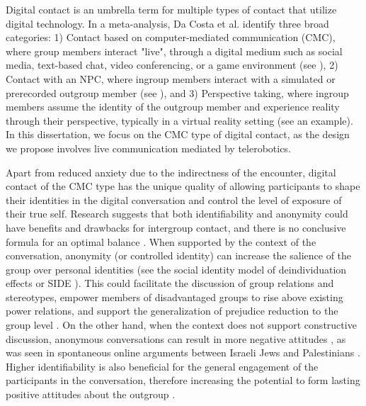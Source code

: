 \documentclass[dissertation,math,vertlayout,pdfa,colorlinks,nologo]{aaltoseries}
\begin{document}
Digital contact is an umbrella term for multiple types of contact that utilize digital technology. In a meta-analysis, Da Costa et al. \cite{pereiradacostaDoesDigitalIntergroup2024} identify three broad categories: 1) Contact based on computer-mediated communication (CMC), where group members interact "live", through a digital medium such as social media, text-based chat, video conferencing, or a game environment (see \cite{whiteTextbasedEcontactHarnessing2020,imperatoAllportMeetsInternet2021,amzalagImprovingIntergroupRelations2021,amichai-hamburgerContactHypothesisReconsidered2006, benatovGamingPeaceVirtual2021}), 2) Contact with an NPC, where ingroup members interact with a simulated or prerecorded outgroup member (see \cite{haslerVirtualPeacemakersMimicry2014,kabiljoVirtualRealityFostering2019}), and 3) Perspective taking, where ingroup members assume the identity of the outgroup member and experience reality through their perspective, typically in a virtual reality setting (see \cite{hassonEnemysGazeImmersive2019} an example). In this dissertation, we focus on the CMC type of digital contact, as the design we propose involves live communication mediated by telerobotics. 

Apart from reduced anxiety due to the indirectness of the encounter, digital contact of the CMC type has the unique quality of allowing participants to shape their identities in the digital conversation and control the level of exposure of their true self. Research suggests that both identifiability and anonymity could have benefits and drawbacks for intergroup contact, and there is no conclusive formula for an optimal balance \cite{haslerOnlineIntergroupContact2013, imperatoAllportMeetsInternet2021, whiteTextbasedEcontactHarnessing2020}. When supported by the context of the conversation, anonymity (or controlled identity) can increase the salience of the group over personal identities (see the social identity model of deindividuation effects or SIDE \cite{reicherSocialIdentityModel1995}). This could facilitate the discussion of group relations and stereotypes, empower members of disadvantaged groups to rise above existing power relations, and support the generalization of prejudice reduction to the group level \cite{kleinSocialIdentityPerformance2016,spearsWhenAreNet2002}. On the other hand, when the context does not support constructive discussion, anonymous conversations can result in more negative attitudes \cite{whiteImprovingIntergroupRelations2015}, as was seen in spontaneous online arguments between Israeli Jews and Palestinians \cite{ellisOnlineArgumentIsraeli2007}. Higher identifiability is also beneficial for the general engagement of the participants in the conversation, therefore increasing the potential to form lasting positive attitudes about the outgroup \cite{schumannWhenComputermediatedIntergroup2017}.
\end{document}
